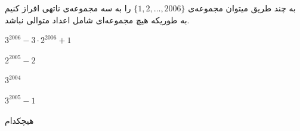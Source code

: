 به چند طریق میتوان مجموعه‌ی $\{1, 2, \dots, 2006\}$ را به سه مجموعه‌ی ناتهی افراز کنیم به طوریکه هیچ مجموعه‌ای شامل اعداد متوالی نباشد. 

\begin{inparaenum}[a)]
    \item $3^{2006} - 3 \cdot 2^{2006} + 1$ 
    \tab \item $2^{2005} - 2$
    \tab \item $3^{2004}$
    \tab \item $3^{2005} - 1$
    \tab \item هیچکدام
\end{inparaenum}